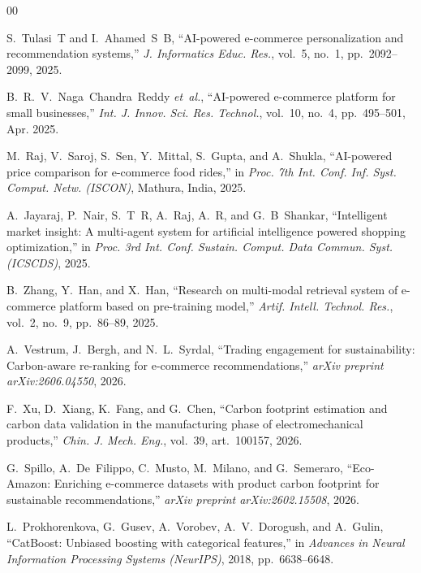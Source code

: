 \documentclass[conference]{IEEEtran}
\begin{document}
\begin{thebibliography}{00}

S.~Tulasi~T and I.~Ahamed~S~B, ``AI-powered e-commerce personalization and recommendation systems,'' \textit{J. Informatics Educ. Res.}, vol.~5, no.~1, pp.~2092--2099, 2025.

B.~R.~V.~Naga~Chandra~Reddy \textit{et~al.}, ``AI-powered e-commerce platform for small businesses,'' \textit{Int. J. Innov. Sci. Res. Technol.}, vol.~10, no.~4, pp.~495--501, Apr. 2025.

M.~Raj, V.~Saroj, S.~Sen, Y.~Mittal, S.~Gupta, and A.~Shukla, ``AI-powered price comparison for e-commerce food rides,'' in \textit{Proc. 7th Int. Conf. Inf. Syst. Comput. Netw. (ISCON)}, Mathura, India, 2025.

A.~Jayaraj, P.~Nair, S.~T~R, A.~Raj, A.~R, and G.~B~Shankar, ``Intelligent market insight: A multi-agent system for artificial intelligence powered shopping optimization,'' in \textit{Proc. 3rd Int. Conf. Sustain. Comput. Data Commun. Syst. (ICSCDS)}, 2025.

B.~Zhang, Y.~Han, and X.~Han, ``Research on multi-modal retrieval system of e-commerce platform based on pre-training model,'' \textit{Artif. Intell. Technol. Res.}, vol.~2, no.~9, pp.~86--89, 2025.

A.~Vestrum, J.~Bergh, and N.~L.~Syrdal, ``Trading engagement for sustainability: Carbon-aware re-ranking for e-commerce recommendations,'' \textit{arXiv preprint arXiv:2606.04550}, 2026.

F.~Xu, D.~Xiang, K.~Fang, and G.~Chen, ``Carbon footprint estimation and carbon data validation in the manufacturing phase of electromechanical products,'' \textit{Chin. J. Mech. Eng.}, vol.~39, art.~100157, 2026.

G.~Spillo, A.~De~Filippo, C.~Musto, M.~Milano, and G.~Semeraro, ``Eco-Amazon: Enriching e-commerce datasets with product carbon footprint for sustainable recommendations,'' \textit{arXiv preprint arXiv:2602.15508}, 2026.

L.~Prokhorenkova, G.~Gusev, A.~Vorobev, A.~V.~Dorogush, and A.~Gulin, ``CatBoost: Unbiased boosting with categorical features,'' in \textit{Advances in Neural Information Processing Systems (NeurIPS)}, 2018, pp.~6638--6648.


\end{thebibliography}
\end{document}
